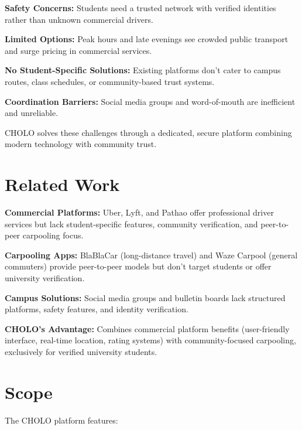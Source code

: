 \documentclass[12pt,a4paper]{article}
\begin{document}
\textbf{Safety Concerns:} Students need a trusted network with verified identities rather than unknown commercial drivers.

\textbf{Limited Options:} Peak hours and late evenings see crowded public transport and surge pricing in commercial services.

\textbf{No Student-Specific Solutions:} Existing platforms don't cater to campus routes, class schedules, or community-based trust systems.

\textbf{Coordination Barriers:} Social media groups and word-of-mouth are inefficient and unreliable.

CHOLO solves these challenges through a dedicated, secure platform combining modern technology with community trust.

\section{Related Work}

\textbf{Commercial Platforms:} Uber, Lyft, and Pathao offer professional driver services but lack student-specific features, community verification, and peer-to-peer carpooling focus.

\textbf{Carpooling Apps:} BlaBlaCar (long-distance travel) and Waze Carpool (general commuters) provide peer-to-peer models but don't target students or offer university verification.

\textbf{Campus Solutions:} Social media groups and bulletin boards lack structured platforms, safety features, and identity verification.

\textbf{CHOLO's Advantage:} Combines commercial platform benefits (user-friendly interface, real-time location, rating systems) with community-focused carpooling, exclusively for verified university students.

\section{Scope}

The CHOLO platform features:
\end{document}
